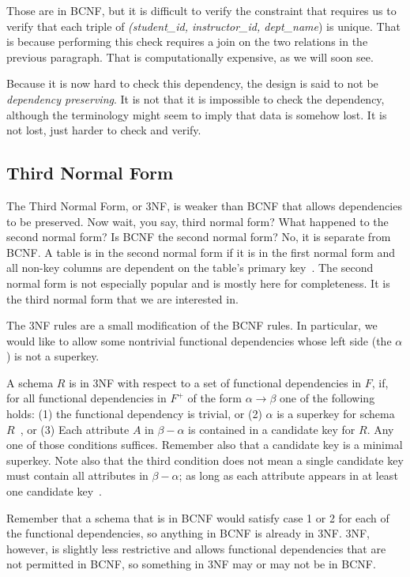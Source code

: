Those are in BCNF, but it is difficult to verify the constraint that requires us to verify that each triple of \textit{(student\_id, instructor\_id, dept\_name}) is unique. That is because performing this check requires a join on the two relations in the previous paragraph. That is computationally expensive, as we will soon see. 

Because it is now hard to check this dependency, the design is said to not be \textit{dependency preserving}. It is not that it is impossible to check the dependency, although the terminology might seem to imply that data is somehow lost. It is not lost, just harder to check and verify.

\subsection*{Third Normal Form}
The Third Normal Form, or 3NF, is weaker than BCNF that allows dependencies to be preserved. Now wait, you say, third normal form? What happened to the second normal form? Is BCNF the second normal form? No, it is separate from BCNF. A table is in the second normal form if it is in the first normal form and all non-key columns are dependent on the table's primary key~\cite{secnorm}. The second normal form is not especially popular and is mostly here for completeness. It is the third normal form that we are interested in. 
 
The 3NF rules are a small modification of the BCNF rules. In particular, we would like to allow some nontrivial functional dependencies whose left side (the $\alpha$) is not a superkey. 

A schema $R$ is in 3NF with respect to a set of functional dependencies in $F$, if, for all functional dependencies in $F^{+}$ of the form $\alpha \rightarrow \beta$ one of the following holds: (1) the functional dependency is trivial, or (2) $\alpha$ is a superkey for schema $R$~\cite{dsc}, or (3) Each attribute $A$ in $\beta - \alpha$ is contained in a candidate key for $R$. Any one of those conditions suffices. Remember also that a candidate key is a minimal superkey. Note also that the third condition does not mean a single candidate key must contain all attributes in $\beta - \alpha$; as long as each attribute appears in at least one candidate key~\cite{dsc}.

Remember that a schema that is in BCNF would satisfy case 1 or 2 for each of the functional dependencies, so anything in BCNF is already in 3NF. 3NF, however, is slightly less restrictive and allows functional dependencies that are not permitted in BCNF, so something in 3NF may or may not be in BCNF.

